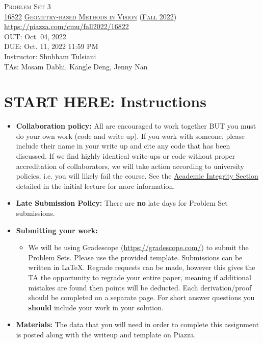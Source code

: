 \documentclass[11pt,addpoints,answers]{exam}
\title{\textsc{\hwName}} %
\author{}
\date{}
\date{}
\numberwithin{equation}{section} %
\numberwithin{figure}{section} %
\numberwithin{table}{section} %
\newcommand{\courseNum}{\href{https://geometric3d.github.io}{16822}}
\newcommand{\courseName}{\href{https://geometric3d.github.io}{Geometry-based Methods in Vision}}
\newcommand{\courseSem}{\href{https://geometric3d.github.io}{Fall 2022}}
\newcommand{\courseUrl}{\url{https://piazza.com/cmu/fall2022/16822}}
\newcommand{\hwNum}{Problem Set 3}
\newcommand{\hwTopic}{Single View Geometry and Reconstruction}
\newcommand{\outDate}{Oct. 04, 2022}
\newcommand{\dueDate}{Oct. 11, 2022 11:59 PM}
\newcommand{\instructorName}{Shubham Tulsiani}
\newcommand{\taNames}{Mosam Dabhi, Kangle Deng, Jenny Nan}
\begin{document}
\section*{}
\begin{center}
  \textsc{\LARGE \hwNum} \\
  \vspace{1em}
  \textsc{\large \courseNum{} \courseName{} (\courseSem)} \\
  \courseUrl\\
  \vspace{1em}
  OUT: \outDate \\
  DUE: \dueDate \\
  Instructor: \instructorName \\
  TAs: \taNames
\end{center}

\section*{START HERE: Instructions}
\begin{itemize}
\item \textbf{Collaboration policy:} All are encouraged to work together BUT you must do your own work (code and write up). If you work with someone, please include their name in your write up and cite any code that has been discussed. If we find highly identical write-ups or code without proper accreditation of collaborators, we will take action according to university policies, i.e. you will likely fail the course. See the \href{https://www.dropbox.com/s/z6o0tinc9eaez46/L01_Overview.pdf?dl=0}{Academic Integrity Section} detailed in the initial lecture for more information.

\item\textbf{Late Submission Policy:} There are \textbf{no} late days for Problem Set submissions.

\item\textbf{Submitting your work:}

\begin{itemize}

\item We will be using Gradescope (\url{https://gradescope.com/}) to submit the Problem Sets. Please use the provided template. Submissions can be written in LaTeX. Regrade requests can be made, however this gives the TA the opportunity to regrade your entire paper, meaning if additional mistakes are found then points will be deducted.
Each derivation/proof should be  completed on a separate page. For short answer questions you \textbf{should} include your work in your solution.  
\end{itemize}

\item \textbf{Materials:} The data that you will need in order to complete this assignment is posted along with the writeup and template on Piazza.

\end{itemize}
\end{document}
